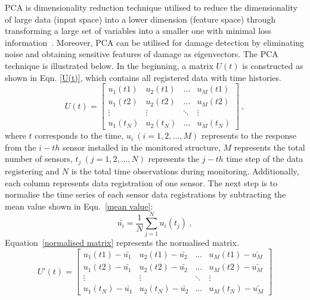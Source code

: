 PCA is dimensionality reduction technique utilised to reduce the dimensionality of large data (input space) into a lower dimension (feature space) through transforming a large set of variables into a smaller one with minimal loss information~\cite{Jolliffe2002}.
Moreover, PCA can be utilised for damage detection by eliminating noise and obtaining sensitive features of damage as eigenvectors.
The PCA technique is illustrated below.
In the beginning, a matrix \(U(t)\) is constructed as shown in Eqn. \ref{U(t)}, which contains all registered data with time histories.
\begin{equation}
	U(t)=
	\begin{bmatrix}
		u_1{(t1)}       & u_2{(t1)} & \dots & u_M{(t1)} \\
		u_1{(t2)}       & u_2{(t2)} & \dots & u_M{(t2)} \\
		\vdots 			& \vdots 	& \ddots & \vdots \\
		u_1{(t_N)}      & u_2{(t_N)} & \dots & u_M{(t_N)}
	\end{bmatrix}\ ,
	\label{U(t)}
\end{equation}
where \(t\) corresponds to the time, \(u_i\ (i = 1, 2, ..., M)\) represents to the response from the \(i-th\) sensor installed in the monitored structure, \(M\) represents the total number of sensors, \(t_j\ (j = 1, 2, ..., N)\) represents the \(j-th\) time step of the data registering and \(N\) is the total time observations during monitoring.
Additionally, each column represents data registration of one sensor.
The next step is to normalise the time series of each sensor data registrations by subtracting the mean value shown in Eqn.~\ref{mean value}:
\begin{equation}
	\bar{u_i} = \frac{1}{N}\sum_{j=1}^{N}u_i(t_j)\ ,
	\label{mean value}
\end{equation}
Equation~\ref{normalised matrix} represents the normalised matrix.
\begin{equation}
	U'(t)=
	\begin{bmatrix}
		u_1{(t1)}-\bar{u_1}       & u_2{(t1)}-\bar{u_2} & \dots  & u_M{(t1)}-\bar{u_M} \\
		u_1{(t2)}-\bar{u_1}       & u_2{(t2)}-\bar{u_2} & \dots  & u_M{(t2)}-\bar{u_M} \\
		\vdots 					  & \vdots 	  			& \ddots & \vdots \\
		u_1{(t_N)}-\bar{u_1}      & u_2{(t_N)}-\bar{u_2}& \dots  & u_M{(t_N)}-\bar{u_M}
	\end{bmatrix}
	\label{normalised matrix}
\end{equation}
